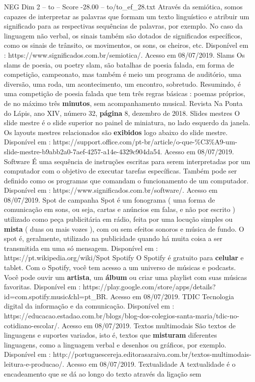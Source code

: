 \begin{textsample}{NEG Dim 2 – to – Score -28.00 – to/to\_ef\_28.txt}
Através da semiótica, somos capazes de interpretar as palavras que formam um texto linguístico e atribuir um significado para as respectivas sequências de palavras, por exemplo.
No caso da linguagem não verbal, os sinais também são dotados de significados específicos, como os sinais de trânsito, os movimentos, os sons, os cheiros, etc.
Disponível em : https://www.significados.com.br/semiotica/.
Acesso em 08/07/2019.
Slams Os slams de poesia, ou poetry slam, são batalhas de poesia falada, em forma de competição, campeonato, mas também é meio um programa de auditório, uma diversão, uma roda, um acontecimento, um encontro, sobretudo.
Resumindo, é uma competição de poesia falada que tem três regras básicas : poemas próprios, de no máximo três \textbf{minutos}, sem acompanhamento musical.
Revista Na Ponta do Lápis, ano XIV, número 32, \textbf{página} 8, dezembro de 2018.
Slides mestres O slide mestre é o slide superior no painel de miniatura, no lado esquerdo da janela.
Os layouts mestres relacionados são \textbf{exibidos} logo abaixo do slide mestre.
Disponível em : https://support.office.com/pt-br/article/o-que-\%C3\%A9-um-slide-mestre-b9abb2a0-7aef-4257-a14e-4329c904da54.
Acesso em 08/07/2019.
Software É uma sequência de instruções escritas para serem interpretadas por um computador com o objetivo de executar tarefas específicas.
Também pode ser definido como os programas que comandam o funcionamento de um computador.
Disponível em : https://www.significados.com.br/software/.
Acesso em 08/07/2019.
Spot de campanha Spot é um fonograma ( uma forma de comunicação em sons, ou seja, cartas e anúncios em falas, e não por escrito ) utilizado como peça publicitária em rádio, feita por uma locução simples ou \textbf{mista} ( duas ou mais vozes ), com ou sem efeitos sonoros e música de fundo.
O spot é, geralmente, utilizado na publicidade quando há muita coisa a ser transmitida em uma só mensagem.
Disponível em : https://pt.wikipedia.org/wiki/Spot Spotify O Spotify é gratuito para \textbf{celular} e tablet.
Com o Spotify, você tem acesso a um universo de músicas e podcasts.
Você pode ouvir um \textbf{artista}, um \textbf{álbum} ou criar uma playlist com suas músicas favoritas.
Disponível em : https://play.google.com/store/apps/details? id=com.spotify.music\&hl=pt\_BR.
Acesso em 08/07/2019.
TDIC Tecnologia digital da informação e da comunicação.
Disponível em : https://educacao.estadao.com.br/blogs/blog-dos-colegios-santa-maria/tdic-no-cotidiano-escolar/.
Acesso em 08/07/2019.
Textos multimodais São textos de linguagens e suportes variados, isto é, textos que \textbf{misturam} diferentes linguagens, como a linguagem verbal e desenhos ou gráficos, por exemplo.
Disponível em : http://portuguescereja.editorasaraiva.com.br/textos-multimodais-leitura-e-producao/.
Acesso em 08/07/2019.
Textualidade A textualidade é o encadeamento que se dá ao longo do texto através da ligação sem

\end{textsample}
